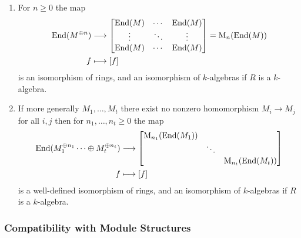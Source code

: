 \begin{corollary}
  \label{corollary: decomposition of endomorphisms for orthogonal modules}
  \leavevmode
  \begin{enumerate}
    \item
      For $n \geq 0$ the map
      \begin{align*}
                  \operatorname{End}(M^{\oplus n})
        &\longrightarrow  \begin{bmatrix}
                    \operatorname{End}(M) & \cdots  & \operatorname{End}(M) \\
                    \vdots  & \ddots  & \vdots  \\
                    \operatorname{End}(M) & \cdots  & \operatorname{End}(M)
                  \end{bmatrix}
        =        \operatorname{M}_n( \operatorname{End}(M) )
        \\
                      f
        &\longmapsto  [f]
      \end{align*}
      is an isomorphism of rings, and an isomorphism of $k$-algebras if $R$ is a $k$-algebra.
    \item
      If more generally $M_1, \dotsc, M_t$ there exist no nonzero homomorphism $M_i \to M_j$ for all $i, j$ then for $n_1, \dotsc, n_t \geq 0$ the map
      \begin{align*}
                  \operatorname{End}(M_1^{\oplus n_1} \dotsb \oplus M_t^{\oplus n_t})
        &\longrightarrow  \begin{bmatrix}
                      \operatorname{M}_{n_1}( \operatorname{End}(M_1) )
                    & {}
                    & {}
                    \\
                      {}
                    & \ddots
                    & {}
                    \\
                      {}
                    & {}
                    & \operatorname{M}_{n_t}( \operatorname{End}(M_t) )
                  \end{bmatrix}
        \\
                      f
        &\longmapsto  [f]
      \end{align*}
      is a well-defined isomorphism of rings, and an isomorphism of $k$-algebras if $R$ is a $k$-algebra.
  \end{enumerate}
\end{corollary}





\subsubsection{Compatibility with Module Structures}


